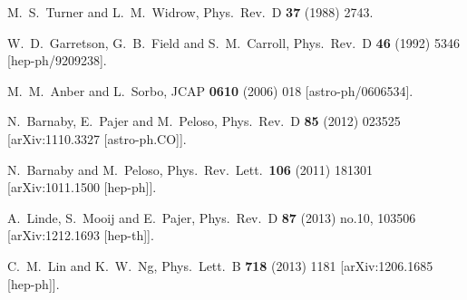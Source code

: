 \begin{thebibliography}{10}
  M.~S.~Turner and L.~M.~Widrow,
  Phys.\ Rev.\ D {\bf 37} (1988) 2743.


  W.~D.~Garretson, G.~B.~Field and S.~M.~Carroll,
  Phys.\ Rev.\ D {\bf 46} (1992) 5346
  [hep-ph/9209238].


  M.~M.~Anber and L.~Sorbo,
  JCAP {\bf 0610} (2006) 018
  [astro-ph/0606534].


  N.~Barnaby, E.~Pajer and M.~Peloso,
  Phys.\ Rev.\ D {\bf 85} (2012) 023525
  [arXiv:1110.3327 [astro-ph.CO]].


  N.~Barnaby and M.~Peloso,
  Phys.\ Rev.\ Lett.\  {\bf 106} (2011) 181301
  [arXiv:1011.1500 [hep-ph]].


  A.~Linde, S.~Mooij and E.~Pajer,
  Phys.\ Rev.\ D {\bf 87} (2013) no.10,  103506
  [arXiv:1212.1693 [hep-th]].


  C.~M.~Lin and K.~W.~Ng,
  Phys.\ Lett.\ B {\bf 718} (2013) 1181
  [arXiv:1206.1685 [hep-ph]].



\end{thebibliography}
